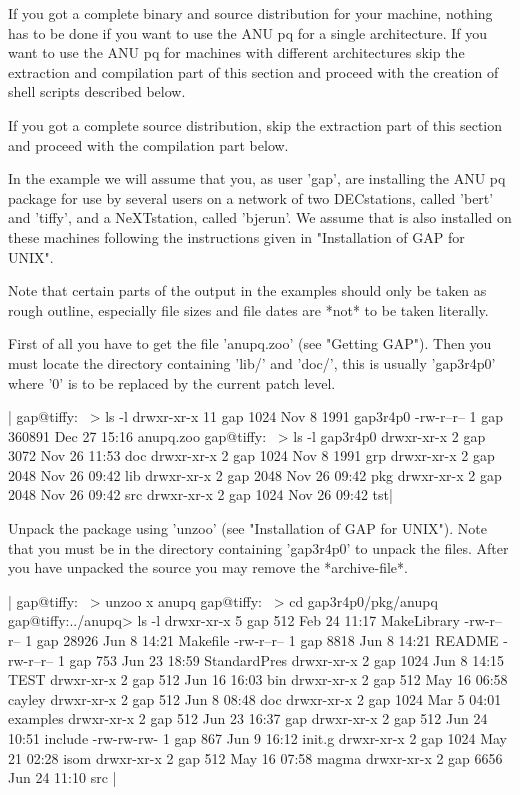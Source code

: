 If you got  a complete binary  and source distribution for your  machine,
nothing has   to be done if  you  want to use   the ANU  pq for  a single
architecture. If  you want to use the  ANU pq for machines with different
architectures skip  the extraction and compilation  part of  this section
and proceed with the creation of shell scripts described below.

If you  got a complete source distribution,  skip the  extraction part of
this section and proceed with the compilation part below.

In the example we will assume that you, as user 'gap', are installing the
ANU pq package for use by several users on a network  of two DECstations,
called 'bert' and 'tiffy', and a NeXTstation,  called 'bjerun'. We assume
that  {\GAP}  is   also  installed  on   these  machines   following  the
instructions given in "Installation of GAP for UNIX".

Note that certain parts  of  the  output  in the examples should  only be
taken as rough outline, especially file sizes and file dates are *not* to
be taken literally.

First of  all you have to  get the file  'anupq.zoo' (see "Getting GAP").
Then you  must locate the {\GAP} directory  containing 'lib/' and 'doc/',
this is usually  'gap3r4p0' where '0'  is to be  replaced by  the current
patch level.

|    gap@tiffy:~ > ls -l
    drwxr-xr-x  11 gap     1024 Nov  8  1991 gap3r4p0
    -rw-r--r--   1 gap   360891 Dec 27 15:16 anupq.zoo
    gap@tiffy:~ > ls -l gap3r4p0
    drwxr-xr-x   2 gap     3072 Nov 26 11:53 doc
    drwxr-xr-x   2 gap     1024 Nov  8  1991 grp
    drwxr-xr-x   2 gap     2048 Nov 26 09:42 lib
    drwxr-xr-x   2 gap     2048 Nov 26 09:42 pkg
    drwxr-xr-x   2 gap     2048 Nov 26 09:42 src
    drwxr-xr-x   2 gap     1024 Nov 26 09:42 tst|

Unpack the package using 'unzoo'  (see "Installation  of GAP for  UNIX").
Note that  you must be in the  directory containing 'gap3r4p0'  to unpack
the files.    After you have  unpacked   the source  you may  remove  the
*archive-file*.

|    gap@tiffy:~ > unzoo x anupq
    gap@tiffy:~ > cd gap3r4p0/pkg/anupq
    gap@tiffy:../anupq> ls -l
    drwxr-xr-x  5 gap       512 Feb 24 11:17 MakeLibrary
    -rw-r--r--  1 gap     28926 Jun  8 14:21 Makefile
    -rw-r--r--  1 gap      8818 Jun  8 14:21 README
    -rw-r--r--  1 gap       753 Jun 23 18:59 StandardPres
    drwxr-xr-x  2 gap      1024 Jun  8 14:15 TEST
    drwxr-xr-x  2 gap       512 Jun 16 16:03 bin
    drwxr-xr-x  2 gap       512 May 16 06:58 cayley
    drwxr-xr-x  2 gap       512 Jun  8 08:48 doc
    drwxr-xr-x  2 gap      1024 Mar  5 04:01 examples
    drwxr-xr-x  2 gap       512 Jun 23 16:37 gap
    drwxr-xr-x  2 gap       512 Jun 24 10:51 include
    -rw-rw-rw-  1 gap       867 Jun  9 16:12 init.g
    drwxr-xr-x  2 gap      1024 May 21 02:28 isom
    drwxr-xr-x  2 gap       512 May 16 07:58 magma
    drwxr-xr-x  2 gap      6656 Jun 24 11:10 src |

